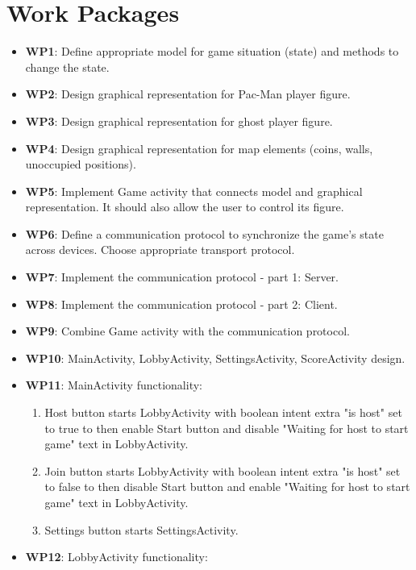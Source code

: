 \documentclass{report}
\begin{document}
\section{Work Packages}


\begin{itemize}
	\item {\bf WP1}: Define appropriate model for game situation (state) and methods to change the state.        
	\item {\bf WP2}: Design graphical representation for Pac-Man player figure.
	\item {\bf WP3}: Design graphical representation for ghost player figure.
	\item {\bf WP4}: Design graphical representation for map elements (coins, walls, unoccupied positions).
	\item {\bf WP5}: Implement Game activity that connects model and graphical representation. It should also allow the user to control its figure.
	\item {\bf WP6}: Define a communication protocol to synchronize the game's state across devices. Choose appropriate transport protocol.
	\item {\bf WP7}: Implement the communication protocol - part 1: Server.
	\item {\bf WP8}: Implement the communication protocol - part 2: Client.
	\item {\bf WP9}: Combine Game activity with the communication protocol.
	\item {\bf WP10}: MainActivity, LobbyActivity, SettingsActivity, ScoreActivity design.
	\item {\bf WP11}: MainActivity functionality:
		\begin{enumerate}
			\item Host button starts LobbyActivity with boolean intent extra "is host" set to true to then enable Start button and disable "Waiting for host to start game" text in LobbyActivity.
			\item Join button starts LobbyActivity with boolean intent extra "is host" set to false to then disable Start button and enable "Waiting for host to start game" text in LobbyActivity.
			\item Settings button starts SettingsActivity.
		\end{enumerate}
	\item {\bf WP12}: LobbyActivity functionality:
		\begin{enumerate}

\end{enumerate}
\end{itemize}
\end{document}

